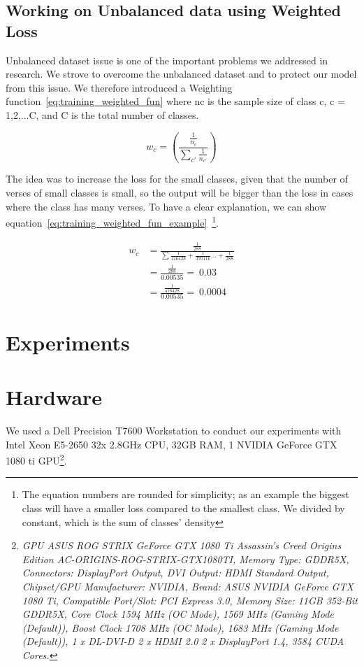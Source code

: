 \subsection{Working on Unbalanced data using Weighted Loss}\label{Sec:W_Loss}

Unbalanced dataset issue is one of the important problems we addressed in research. We strove to overcome the unbalanced dataset and to protect our model from this issue. We therefore introduced a Weighting function~\ref{eq:training_weighted_fun} where nc is the sample size of class c, c = 1,2,...C, and C is the total number of classes.%

\begin{equation}\label{eq:training_weighted_fun}
 w_c = \left(\frac{\frac{1}{n_c}}{\sum_{c'} \frac{1}{n_{c'}}} \right)
\end{equation}

The idea was to increase the loss for the small classes, given that the number of verses of small classes is small, so the output will be bigger than the loss in cases where the class has many verses. To have a clear explanation, we can show equation~\ref{eq:training_weighted_fun_example}~\footnote{The equation numbers are rounded for simplicity; as an example the biggest class will have a smaller loss compared to the smallest class. We divided by constant, which is the sum of classes’ density}.

\begin{subequations}
 \begin{align}
 w_c &= \frac{\frac{1}{288}}{\sum\frac{1}{416428}+\frac{1}{370116}\dots+\frac{1}{288}}\\
  &= \frac{\frac{1}{288}}{0.00535} = ~0.03 \\
  &= \frac{\frac{1}{416428}}{0.00535} = ~0.0004
 \end{align}\label{eq:training_weighted_fun_example}
\end{subequations}

\clearpage

\section{Experiments}

\section{Hardware}

We used a Dell Precision T7600 Workstation to conduct our experiments with Intel Xeon E5-2650 32x 2.8GHz CPU, 32GB RAM, 1 NVIDIA GeForce GTX 1080 ti GPU\footnote{\textit{GPU ASUS ROG STRIX GeForce GTX 1080 Ti Assassin's Creed Origins Edition AC-ORIGINS-ROG-STRIX-GTX1080TI, Memory Type: GDDR5X, Connectors: DisplayPort Output, DVI Output: HDMI Standard Output, Chipset/GPU Manufacturer: NVIDIA, Brand: ASUS NVIDIA GeForce GTX 1080 Ti, Compatible Port/Slot: PCI Express 3.0, Memory Size: 11GB 352-Bit GDDR5X, Core Clock 1594 MHz (OC Mode), 1569 MHz (Gaming Mode (Default)), Boost Clock 1708 MHz (OC Mode), 1683 MHz (Gaming Mode (Default)), 1 x DL-DVI-D 2 x HDMI 2.0 2 x DisplayPort 1.4, 3584 CUDA Cores.}}.

